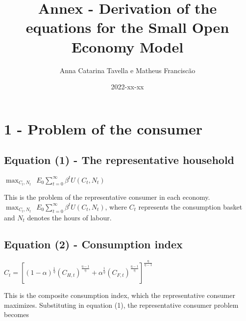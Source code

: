 \documentclass[
]{article}
\title{Annex - Derivation of the equations for the Small Open Economy
Model}
\author{Anna Catarina Tavella e Matheus Franciscão}
\date{2022-xx-xx}
\begin{document}
\maketitle

\hypertarget{section}{%
\section{}\label{section}}

\hypertarget{problem-of-the-consumer}{%
\section{1 - Problem of the consumer}\label{problem-of-the-consumer}}

\vspace{12pt}

\hypertarget{equation-1---the-representative-household}{%
\subsection{Equation (1) - The representative
household}\label{equation-1---the-representative-household}}

\(\displaystyle \max_{C_t,N_t} \ \ E_0 \sum_{t=0}^\infty \beta^tU(C_t,N_t)\)

\vspace{8pt}

This is the problem of the representative consumer in each economy.
\(\displaystyle \max_{C_t,N_t} \ \ E_0 \sum_{t=0}^\infty \beta^tU(C_t,N_t)\),
where \(C_t\) represents the consumption basket and \(N_t\) denotes the
hours of labour.

\vspace{12pt}

\hypertarget{equation-2---consumption-index}{%
\subsection{Equation (2) - Consumption
index}\label{equation-2---consumption-index}}

\(C_t=\left[ (1-\alpha)^{\frac{1}{\eta}} (C_{H,t})^{\frac{\eta-1}{\eta}} + \alpha^{\frac{1}{\eta}} (C_{F,t})^{\frac{\eta-1}{\eta}} \right]^{\frac{\eta}{\eta-1}}\)

\vspace{8pt}

This is the composite consumption index, which the representative
consumer maximizes. Substituting in equation (1), the representative
consumer problem becomes
\end{document}
